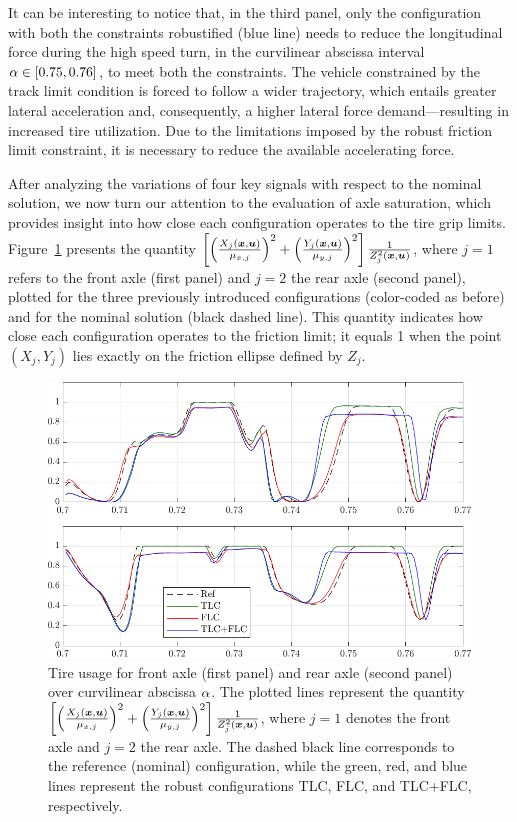 It can be interesting to notice that, in the third panel, only the configuration with both the constraints robustified (blue line) needs to reduce the longitudinal force during the high speed turn, in the curvilinear abscissa interval $\alpha\in\left[0.75, 0.76\right]$, to meet both the constraints. 
The vehicle constrained by the track limit condition is forced to follow a wider trajectory, which entails greater lateral acceleration and, consequently, a higher lateral force demand---resulting in increased tire utilization. Due to the limitations imposed by the robust friction limit constraint, it is necessary to reduce the available accelerating force.

After analyzing the variations of four key signals with respect to the nominal solution, we now turn our attention to the evaluation of axle saturation, which provides insight into how close each configuration operates to the tire grip limits.
Figure~\ref{fig:ol_saturation} presents the quantity $\left[ \left( \frac{X_j(\boldsymbol{x},\boldsymbol{u})}{\mu_{x,j}} \right)^2+ \left( \frac{Y_j(\boldsymbol{x},\boldsymbol{u})}{\mu_{y,j}}\right)^2\right]\frac{1}{Z_j^2(\boldsymbol{x},\boldsymbol{u})}$, where $j=1$ refers to the front axle (first panel) and $j=2$ the rear axle (second panel), plotted for the three previously introduced configurations (color-coded as before) and for the nominal solution (black dashed line). This quantity indicates how close each configuration operates to the friction limit; it equals 1 when the point $\left(X_j, Y_j\right)$ lies exactly on the friction ellipse defined by $Z_j$.

\begin{figure}
	\centering
	\includegraphics{Fig/ol_saturation.pdf}
	\caption{Tire usage for front axle (first panel) and rear axle (second panel) over curvilinear abscissa $\alpha$. The plotted lines represent the quantity $\left[ \left( \frac{X_j(\boldsymbol{x},\boldsymbol{u})}{\mu_{x,j}} \right)^2+ \left( \frac{Y_j(\boldsymbol{x},\boldsymbol{u})}{\mu_{y,j}}\right)^2\right]\frac{1}{Z_j^2(\boldsymbol{x},\boldsymbol{u})}$, where $j=1$ denotes the front axle and $j=2$ the rear axle. The dashed black line corresponds to the reference (nominal) configuration, while the green, red, and blue lines represent the robust configurations TLC, FLC, and TLC+FLC, respectively.}
	\label{fig:ol_saturation}
\end{figure}

